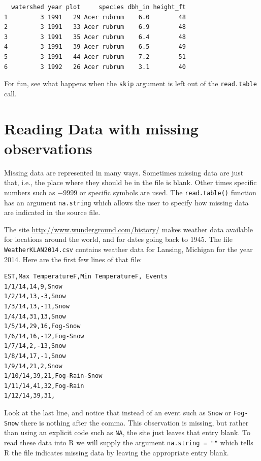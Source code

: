 \documentclass[]{krantz}
\theoremstyle{definition}
\theoremstyle{definition}
\theoremstyle{definition}
\theoremstyle{remark}
\begin{document}
\begin{verbatim}
  watershed year plot     species dbh_in height_ft
1         3 1991   29 Acer rubrum    6.0        48
2         3 1991   33 Acer rubrum    6.9        48
3         3 1991   35 Acer rubrum    6.4        48
4         3 1991   39 Acer rubrum    6.5        49
5         3 1991   44 Acer rubrum    7.2        51
6         3 1992   26 Acer rubrum    3.1        40
\end{verbatim}

For fun, see what happens when the \texttt{skip} argument is left out of
the \texttt{read.table} call.

\section{Reading Data with missing
observations}\label{reading-data-with-missing-observations}

Missing data are represented in many ways. Sometimes missing data are
just that, i.e., the place where they should be in the file is blank.
Other times specific numbers such as \(-9999\) or specific symbols are
used. The \texttt{read.table()} function has an argument
\texttt{na.string} which allows the user to specify how missing data are
indicated in the source file.

The site \url{http://www.wunderground.com/history/} makes weather data
available for locations around the world, and for dates going back to
1945. The file \texttt{WeatherKLAN2014.csv} contains weather data for
Lansing, Michigan for the year 2014. Here are the first few lines of
that file:

\begin{verbatim}
EST,Max TemperatureF,Min TemperatureF, Events
1/1/14,14,9,Snow
1/2/14,13,-3,Snow
1/3/14,13,-11,Snow
1/4/14,31,13,Snow
1/5/14,29,16,Fog-Snow
1/6/14,16,-12,Fog-Snow
1/7/14,2,-13,Snow
1/8/14,17,-1,Snow
1/9/14,21,2,Snow
1/10/14,39,21,Fog-Rain-Snow
1/11/14,41,32,Fog-Rain
1/12/14,39,31,
\end{verbatim}

Look at the last line, and notice that instead of an event such as
\texttt{Snow} or \texttt{Fog-Snow} there is nothing after the comma.
This observation is missing, but rather than using an explicit code such
as \texttt{NA}, the site just leaves that entry blank. To read these
data into R we will supply the argument \texttt{na.string\ =\ ""} which
tells R the file indicates missing data by leaving the appropriate entry
blank.
\end{document}
